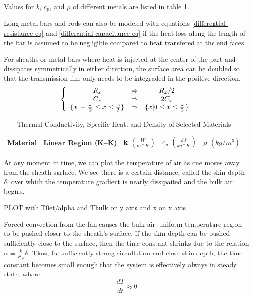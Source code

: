 \documentclass[10pt, twocolumn]{article}
\begin{document}
Values for $k$, $c_{p}$, and $\rho$ of different metals are listed in
\hyperref[thermal-properties-table]{table \ref{thermal-properties-table}}.

Long metal bars and rods can also be modeled with equations
\ref{differential-resistance-eq} and \ref{differential-capacitance-eq}
if the heat loss along the length of the bar is assumed to be
negligible compared to heat transfered at the end faces.

For sheaths or metal bars where heat is injected at the center
of the part and dissipates symmetrically in either direction,
the surface area can be doubled so that the transmission line
only needs to be integraded in the positive direction.
\begin{equation}
\left\{\begin{array}{c c c}
R_{x}	&\Rightarrow	&R_{x}/{2}	\\
C_{x}	&\Rightarrow	&2C_{x}	\\
\{x|-\frac{w}{2} \leq x \leq \frac{w}{2}\}	&\Rightarrow	&\{x|0 \leq x \leq \frac{w}{2}\}	\\
\end{array}\right.
\end{equation}

\begin{table}
\centering
\caption{Thermal Conductivity, Specific Heat, and Density of Selected Materials}
\begin{tabular}{c | c | c | c | c}
\hline\hline
Material	&Linear Region (K--K)	&k \(\left(\frac{W}{m*K}\right)\)	&\(c_{p}\) \(\left(\frac{kJ}{kg*K}\right)\)	&\(\rho\) \((kg/m^{3})\)	\\
\hline\hline

\hline\hline
\end{tabular}
\label{thermal-properties-table}
\end{table}

At any moment in time, we can plot the temperature of air as one
moves away from the sheath surface. We see there is a certain
distance, called the skin depth $\delta$, over which the temperature
gradient is nearly dissipaited and the bulk air begins.

PLOT with T0et/alpha and Tbulk on y axis and x on x axis

Forced convection from the fan causes the bulk air, uniform temperature
region to be pushed closer to the sheath's surface.
If the skin depth can be pushed sufficiently close to the surface,
then the time constant shrinks due to the relation $\alpha=\frac{k}{\rho c_{p}}\delta$.
Thus, for sufficiently strong circullation and close skin depth, the time
constant becomes small enough that the system is effectively always in
steady state, where
\begin{equation*}
\frac{dT}{dt}\approx 0
\end{equation*}
\end{document}
